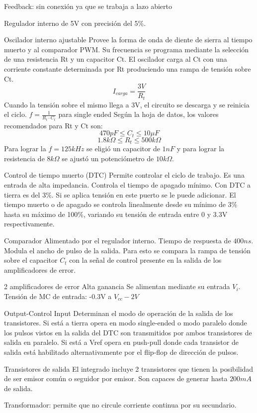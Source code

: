 Feedback: sin conexión ya que se trabaja a lazo abierto

Regulador interno de 5V con precisión del 5\%. 

Oscilador interno ajustable 
Provee la forma de onda de diente de sierra al tiempo muerto y al comparador PWM. 
Su frecuencia se programa mediante la selección de una resistencia Rt y un capacitor Ct. 
El oscilador carga al Ct con una corriente constante determinada por Rt produciendo una rampa de tensión sobre Ct.
$$ I_{carga}=\frac{3V}{R_t} $$
Cuando la tensión sobre el mismo llega a 3V, el circuito se descarga y se reinicia el ciclo. 
$f=\frac{1}{R_t\cdot C_t}$ para single ended 
Según la hoja de datos, los valores recomendados para Rt y Ct son:
$$470pF\leq C_t\leq 10\mu F$$
$$1.8k\Omega\leq R_t\leq 500k\Omega$$
Para lograr la $f=125kHz$ se eligió un capacitor de $1nF$ y para lograr la resistencia de $8k\Omega$ se ajustó un potenciómetro de $10k\Omega$. 

Control de tiempo muerto (DTC)
Permite controlar el ciclo de trabajo. 
Es una entrada de alta impedancia. 
Controla el tiempo de apagado mínimo. Con DTC a tierra es del 3\%.
Si se aplica tensión en este puerto se le puede adicionar.
El tiempo muerto o de apagado se controla linealmente desde su mínimo de 3\% hasta su máximo de 100\%, 
variando su tensión de entrada entre 0 y 3.3V respectivamente. 

Comparador 
Alimentado por el regulador interno. 
Tiempo de respuesta de $400ns$. 
Modula el ancho de pulso de la salida. Para esto se compara la rampa de tensión sobre el capacitor $C_t$ con la señal de control
presente en la salida de los amplificadores de error. 

2 amplificadores de error 
Alta ganancia
Se alimentan mediante su entrada $V_i$. 
Tensión de MC de entrada: -0.3V a $V_{cc}-2V$

Output-Control Input
Determinan el modo de operación de la salida de los transistores. 
Si está a tierra opera en modo single-ended o modo paralelo donde los pulsos vistos en la salida del DTC son transmitidos por ambos transistores de salida en paralelo.
Si está a Vref opera en push-pull donde cada transistor de salida está habilitado alternativamente por el flip-flop de dirección de pulsos.

Transistores de salida
El integrado incluye 2 transistores que tienen la posibilidad de ser emisor común o seguidor por emisor. 
Son capaces de generar hasta $200mA$ de salida. 


Transformador: permite que no circule corriente continua por su secundario. 

